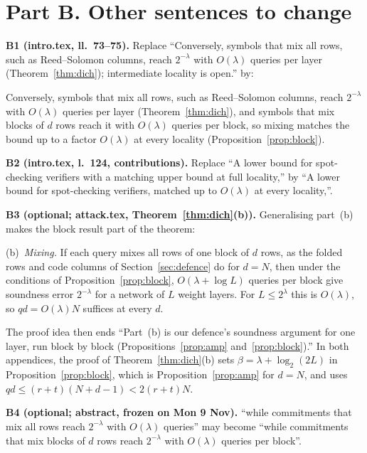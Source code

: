\documentclass[conference,compsoc]{IEEEtran}
\newcommand{\para}[1]{\par\noindent\textbf{#1}\quad}
\theoremstyle{plain}
\theoremstyle{definition}
\theoremstyle{remark}
\begin{document}
\section*{Part B. Other sentences to change}

\para{B1 (intro.tex, ll.~73--75).} Replace ``Conversely, symbols that mix all rows, such as
Reed--Solomon columns, reach $2^{-\lambda}$ with $O(\lambda)$ queries per layer
(Theorem~\ref{thm:dich}); intermediate locality is open.'' by:

\smallskip
\noindent Conversely, symbols that mix all rows, such as Reed--Solomon columns, reach $2^{-\lambda}$
with $O(\lambda)$ queries per layer (Theorem~\ref{thm:dich}), and symbols that mix blocks of $d$ rows
reach it with $O(\lambda)$ queries per block, so mixing matches the bound up to a factor $O(\lambda)$
at every locality (Proposition~\ref{prop:block}).
\smallskip

\para{B2 (intro.tex, l.~124, contributions).} Replace ``A lower bound for spot-checking verifiers
with a matching upper bound at full locality,'' by ``A lower bound for spot-checking verifiers,
matched up to $O(\lambda)$ at every locality,''.

\para{B3 (optional; attack.tex, Theorem~\ref{thm:dich}(b)).} Generalising part~(b) makes the
block result part of the theorem:

\smallskip
\noindent (b)~\emph{Mixing.} If each query mixes all rows of one block of $d$ rows, as the folded
rows and code columns of Section~\ref{sec:defence} do for $d=N$, then under the conditions of
Proposition~\ref{prop:block}, $O(\lambda+\log L)$ queries per block give soundness error
$2^{-\lambda}$ for a network of $L$ weight layers. For $L\le2^{\lambda}$ this is $O(\lambda)$, so
$qd=O(\lambda)N$ suffices at every $d$.
\smallskip

\noindent The proof idea then ends ``Part~(b) is our defence's soundness argument for one layer, run
block by block (Propositions~\ref{prop:amp} and~\ref{prop:block}).'' In both appendices, the proof
of Theorem~\ref{thm:dich}(b) sets $\beta=\lambda+\log_2(2L)$ in Proposition~\ref{prop:block}, which
is Proposition~\ref{prop:amp} for $d=N$, and uses $qd\le(r+t)(N+d-1)<2(r+t)N$.

\para{B4 (optional; abstract, frozen on Mon 9 Nov).} ``while commitments that mix all rows reach
$2^{-\lambda}$ with $O(\lambda)$ queries'' may become ``while commitments that mix blocks of $d$ rows
reach $2^{-\lambda}$ with $O(\lambda)$ queries per block''.
\end{document}
